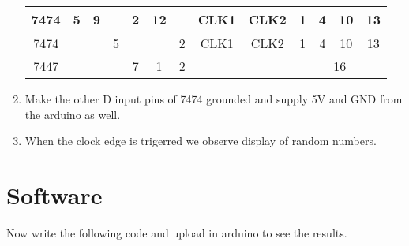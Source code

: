 \documentclass[10pt,a4paper]{article}
\begin{document}
\begin{enumerate}
\begin{tabular}{|c|c|c|c|c|c|c|c|c|c|c|c|c|}
   7474 & 5 & 9 &  & 2 & 12 &  & CLK1 & CLK2 & 1 & 4 &     10 & 13 \\                                            \hline                                                7474 & & & 5 & & & 2 & CLK1 & CLK2 & 1 & 4  & 10 & 13 \\                                                  \hline                                                7447 & \multicolumn{3}{|c|}{} & 7 & 1 & 2 & & & \multicolumn{4}{|c|}{16} \\                               \hline
		\end{tabular}
\item Make the other D input pins of 7474 grounded and supply  5V and GND from the arduino as well.
\item When the clock edge is trigerred we observe display of random numbers.
\end{enumerate}
\section{Software}
Now write the following code and upload in arduino to see the results.

\end{document}
